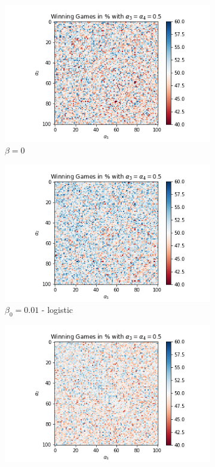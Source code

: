 \begin{figure}[!hb]
	\centering
	\begin{subfigure}{0.3\textwidth}
	    \centering
	    \includegraphics[width=1\linewidth]{Bilder/simulation_2_2}
	    \caption{$\beta=0$}
	    \label{fig:19}
    \end{subfigure}%
	\begin{subfigure}{0.3\textwidth}
	    \centering
	    \includegraphics[width=1\linewidth]{Bilder/simulation_3_2}
	    \caption{$\beta_0=0.01$ - logistic}
	    \label{fig:20}
    \end{subfigure}%
	\begin{subfigure}{0.3\textwidth}
	    \centering
	    \includegraphics[width=1\linewidth]{Bilder/simulation_4_2}

\end{subfigure}
\end{figure}
